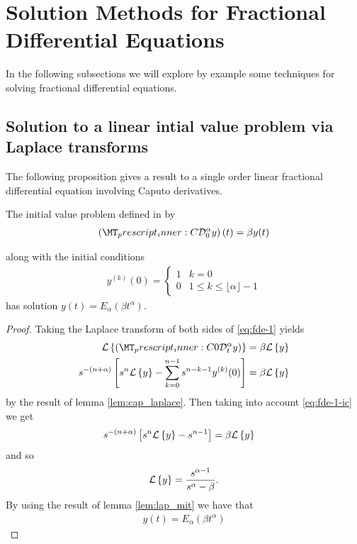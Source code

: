 \section{Solution Methods for Fractional Differential Equations}

In the following subsections we will explore by example some techniques for solving fractional differential equations.

\subsection{Solution to a linear intial value problem via Laplace transforms}
The following proposition gives a result to a single order linear fractional differential equation involving Caputo derivatives.
\begin{mdframed}[innertopmargin=10pt]
\begin{proposition}

	The initial value problem defined in by
	\begin{align}
        \label{eq:fde-1}
        \left( \prescript{C}{}{\mathcal{D}_0^\alpha}y \right)(t) = \beta y(t)
    \end{align}
    
    along with the initial conditions
    \begin{align}
        \label{eq:fde-1-ic}
        y^{(k)}(0) =
        \begin{cases}
        1 & k = 0 \\
        0 & 1 \leq k \leq \lfloor\alpha \rfloor - 1
        \end{cases}
    \end{align}
	has solution $ y(t) = E_\alpha \left( \beta t^\alpha \right) $.
\end{proposition}
\end{mdframed}
\begin{proof}
	Taking the Laplace transform of both sides of \eqref{eq:fde-1} yields
	\begin{align}
		\laplace{\capder{0}{t}{\alpha}{y}} &= \beta \laplace{y} \\
		s^{-(n+\alpha)} \left[s^n \laplace{y} - \sum_{k=0}^{n-1} s^{n-k-1} y^{(k)}(0) \right] &= \beta \laplace{y}
	\end{align}
	by the result of lemma \ref{lem:cap_laplace}. 
	Then taking into account \eqref{eq:fde-1-ic} we get
	\begin{align}
		s^{-(n+\alpha)} \left[s^n \mathcal{L} \left\{ y \right\} - s^{n-1}\right] &= \beta \mathcal{L} \left\{ y \right\}
	\end{align}
	and so 
	\begin{align}
		\mathcal{L} \left\{ y \right\} = \frac{s^{\alpha-1}}{s^\alpha - \beta}.
	\end{align}
	By using the result of lemma \ref{lem:lap_mit} we have that 
	\begin{align}
		y(t) = E_\alpha(\beta t^\alpha)
	\end{align}
\end{proof}

